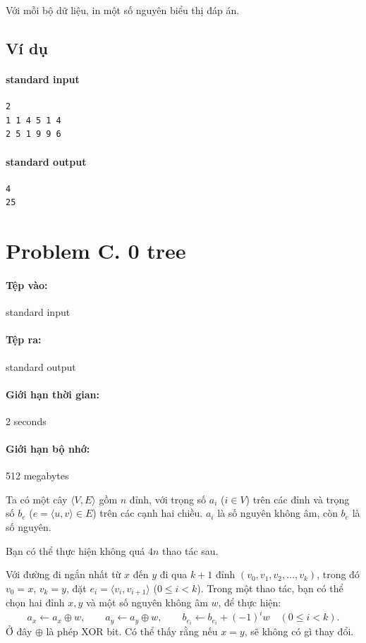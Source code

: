 \documentclass[11pt]{article}
\begin{document}
Với mỗi bộ dữ liệu, in một số nguyên biểu thị đáp án.

\subsection*{Ví dụ}

\paragraph{standard input}
\begin{verbatim}
2
1 1 4 5 1 4
2 5 1 9 9 6
\end{verbatim}

\paragraph{standard output}
\begin{verbatim}
4
25
\end{verbatim}

\section{Problem C. 0 tree}

\paragraph{Tệp vào:} standard input
\paragraph{Tệp ra:} standard output
\paragraph{Giới hạn thời gian:} 2 seconds
\paragraph{Giới hạn bộ nhớ:} 512 megabytes

Ta có một cây \(\langle V,E\rangle\) gồm \(n\) đỉnh, với trọng số \(a_i\)
(\(i\in V\)) trên các đỉnh và trọng số \(b_e\) (\(e=\langle u,v\rangle\in E\))
trên các cạnh hai chiều. \(a_i\) là số nguyên không âm, còn \(b_e\) là số
nguyên.

Bạn có thể thực hiện không quá \(4n\) thao tác sau.

Với đường đi ngắn nhất từ \(x\) đến \(y\) đi qua \(k+1\) đỉnh
\((v_0,v_1,v_2,\ldots,v_k)\), trong đó \(v_0=x\), \(v_k=y\), đặt
\(e_i=\langle v_i,v_{i+1}\rangle\) (\(0\le i<k\)). Trong một thao tác, bạn có
thể chọn hai đỉnh \(x,y\) và một số nguyên không âm \(w\), để thực hiện:
\[
  a_x\leftarrow a_x\oplus w,\qquad
  a_y\leftarrow a_y\oplus w,\qquad
  b_{e_i}\leftarrow b_{e_i}+(-1)^i w\quad (0\le i<k).
\]
Ở đây \(\oplus\) là phép XOR bit. Có thể thấy rằng nếu \(x=y\), sẽ không có
gì thay đổi.
\end{document}
